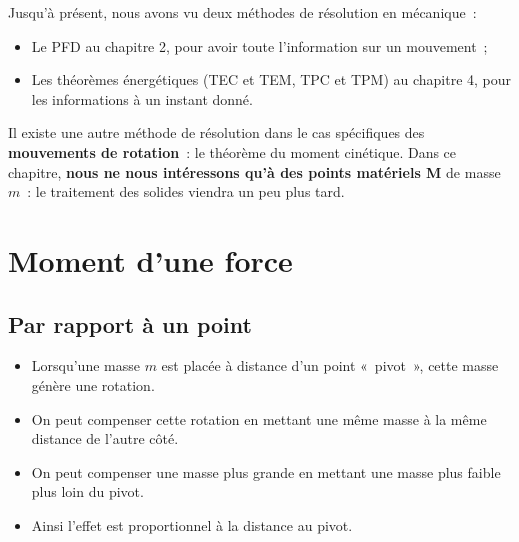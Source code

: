 \documentclass[../../main/main.tex]{subfiles}
\begin{document}
Jusqu'à présent, nous avons vu deux méthodes de résolution en mécanique~:
\begin{itemize}
	\item Le PFD au chapitre 2, pour avoir toute l'information sur un
	      mouvement~;
	\item Les théorèmes énergétiques (TEC et TEM, TPC et TPM) au chapitre 4,
	      pour les informations à un instant donné.
\end{itemize}
Il existe une autre méthode de résolution dans le cas spécifiques des
\textbf{mouvements de rotation}~: le théorème du moment cinétique. Dans ce
chapitre, \textbf{nous ne nous intéressons qu'à des points matériels M} de masse
$m$~: le traitement des solides viendra un peu plus tard.

\section{Moment d'une force}
\subsection{Par rapport à un point}
\begin{itemize}
	\item Lorsqu'une masse $m$ est placée à distance d'un point «~pivot~», cette
	      masse génère une rotation.
	\item On peut compenser cette rotation en mettant une même masse à la même
	      distance de l'autre côté.
	\item On peut compenser une masse plus grande en mettant une masse plus
	      faible plus loin du pivot.
	\item Ainsi l'effet est proportionnel à la distance au pivot.
\end{itemize}
\end{document}
